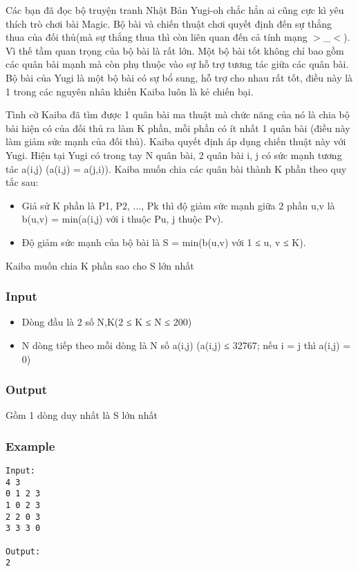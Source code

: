 



   Các bạn đã đọc bộ truyện tranh Nhật Bản Yugi-oh chắc hẳn ai cũng cực kì yêu thích trò chơi bài Magic. Bộ bài và chiến thuật chơi quyết định đến sự thắng thua của đối thủ(mà sự thắng thua thì còn liên quan đến cả tính mạng $>$\_$<$). Vì thế tầm quan trọng của bộ bài là rất lớn. Một bộ bài tốt không chỉ bao gồm các quân bài mạnh mà còn phụ thuộc vào sự hỗ trợ tương tác giữa các quân bài. Bộ bài của Yugi là một bộ bài có sự bổ sung, hỗ trợ cho nhau rất tốt, điều này là 1 trong các nguyên nhân khiến Kaiba luôn là kẻ chiến bại.  

   Tình cờ Kaiba đã tìm được 1 quân bài ma thuật mà chức năng của nó là chia bộ bài hiện có của đối thủ ra làm K phần, mỗi phần có ít nhất 1 quân bài (điều này làm giảm sức mạnh của đối thủ). Kaiba quyết định áp dụng chiến thuật này với Yugi. Hiện tại Yugi có trong tay N quân bài, 2 quân bài i, j có sức mạnh tương tác a(i,j) (a(i,j) = a(j,i)). Kaiba muốn chia các quân bài thành K phần theo quy tắc sau:  
\begin{itemize}
	\item     Giả sử K phần là P1, P2, ..., Pk thì độ giảm sức mạnh giữa 2 phần u,v là b(u,v) = min(a(i,j) với i thuộc Pu, j thuộc Pv).   
	\item     Độ giảm sức mạnh của bộ bài là S = min(b(u,v) với 1 ≤ u, v ≤ K).   
\end{itemize}

   Kaiba muốn chia K phần sao cho S lớn nhất  

\subsubsection{   Input  }
\begin{itemize}
	\item     Dòng đầu là 2 số N,K(2 ≤ K ≤ N ≤ 200)   
	\item     N dòng tiếp theo mỗi dòng là N số a(i,j) (a(i,j) ≤ 32767; nếu i = j thì a(i,j) = 0)   
\end{itemize}

\subsubsection{   Output  }

   Gồm 1 dòng duy nhất là S lớn nhất  

\subsubsection{   Example  }
\begin{verbatim}
Input:
4 3
0 1 2 3
1 0 2 3
2 2 0 3
3 3 3 0

Output:
2
\end{verbatim}